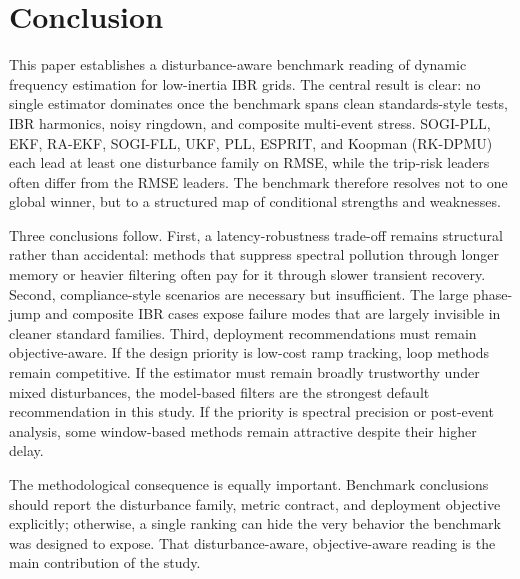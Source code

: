 \section{Conclusion}
\label{sec:conclusion}

This paper establishes a disturbance-aware benchmark reading of dynamic frequency estimation for low-inertia IBR grids. The central result is clear: no single estimator dominates once the benchmark spans clean standards-style tests, IBR harmonics, noisy ringdown, and composite multi-event stress. SOGI-PLL, EKF, RA-EKF, SOGI-FLL, UKF, PLL, ESPRIT, and Koopman (RK-DPMU) each lead at least one disturbance family on RMSE, while the trip-risk leaders often differ from the RMSE leaders. The benchmark therefore resolves not to one global winner, but to a structured map of conditional strengths and weaknesses.

Three conclusions follow. First, a latency-robustness trade-off remains structural rather than accidental: methods that suppress spectral pollution through longer memory or heavier filtering often pay for it through slower transient recovery. Second, compliance-style scenarios are necessary but insufficient. The large phase-jump and composite IBR cases expose failure modes that are largely invisible in cleaner standard families. Third, deployment recommendations must remain objective-aware. If the design priority is low-cost ramp tracking, loop methods remain competitive. If the estimator must remain broadly trustworthy under mixed disturbances, the model-based filters are the strongest default recommendation in this study. If the priority is spectral precision or post-event analysis, some window-based methods remain attractive despite their higher delay.

The methodological consequence is equally important. Benchmark conclusions should report the disturbance family, metric contract, and deployment objective explicitly; otherwise, a single ranking can hide the very behavior the benchmark was designed to expose. That disturbance-aware, objective-aware reading is the main contribution of the study.
